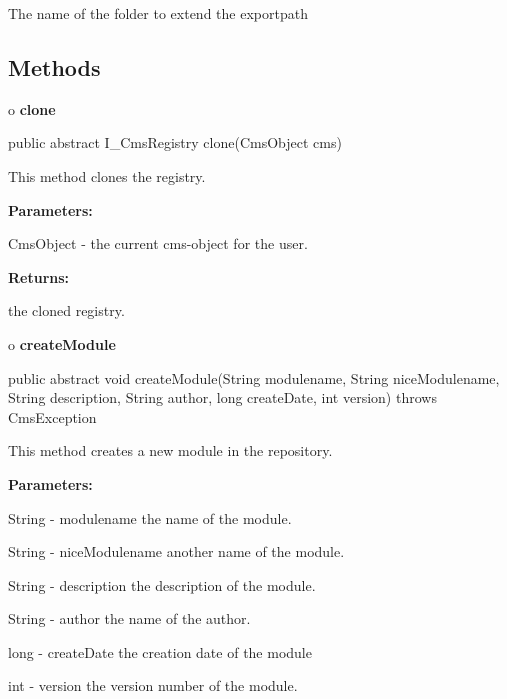\begin{description}
\htmlDD The name of the folder to extend the exportpath

\end{description}

\subsection*{  Methods }

o {\bf clone} 

\begin{PRE}
 public abstract I\_CmsRegistry clone(CmsObject cms)
\end{PRE}

\begin{description}
\htmlDD This method clones the registry. 

\begin{description}
\item {\bf Parameters:}  

CmsObject - the current cms-object for the user.  
\item {\bf Returns:}  

the cloned registry.  
\end{description}

\end{description}

o {\bf createModule} 

\begin{PRE}
 public abstract void createModule(String modulename,
                                   String niceModulename,
                                   String description,
                                   String author,
                                   long createDate,
                                   int version) throws CmsException
\end{PRE}

\begin{description}
\htmlDD This method creates a new module in the repository. 

\begin{description}
\item {\bf Parameters:}  

String - modulename the name of the module.  

String - niceModulename another name of the module.  

String - description the description of the module.  

String - author the name of the author.  

long - createDate the creation date of the module  

int - version the version number of the module.  
\end{description}

\end{description}

